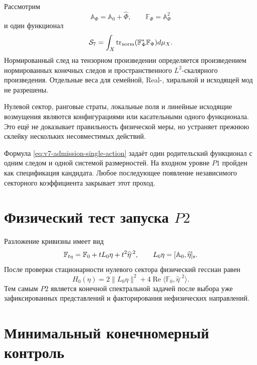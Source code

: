 Рассмотрим
\begin{equation}
 \mathbb A_\Phi=\mathbb A_0+\widehat\Phi,
 \qquad
 \mathbb F_\Phi=\mathbb A_\Phi^2
\end{equation}
и один функционал
\begin{equation}
 \mathcal S_7
 =\int_X\operatorname{tr}_{\rm norm}
 (\mathbb F_\Phi^*\mathbb F_\Phi)d\mu_X.
 \label{eq:v7-admission-single-action}
\end{equation}
Нормированный след на тензорном произведении определяется произведением
нормированных конечных следов и пространственного $L^2$-скалярного
произведения. Отдельные веса для семейной, Real-, хиральной и исходящей мод
не разрешены.

Нулевой сектор, ранговые страты, локальные поля и линейные исходящие
возмущения являются конфигурациями или касательными одного функционала.
Это ещё не доказывает правильность физической меры, но устраняет прежнюю
склейку нескольких несовместимых действий.

\begin{proposition}
Формула \eqref{eq:v7-admission-single-action} задаёт один родительский
функционал с одним следом и одной системой размерностей. На входном уровне
$P1$ пройден как спецификация кандидата. Любое последующее появление
независимого секторного коэффициента закрывает этот проход.
\end{proposition}

\section{Физический тест запуска \texorpdfstring{$P2$}{P2}}

Разложение кривизны имеет вид
\begin{equation}
 \mathbb F_{t\eta}
 =\mathbb F_0+tL_0\eta+t^2\widehat\eta^{,2},
 \qquad
 L_0\eta=[\mathbb A_0,\widehat\eta]_{\rm s}.
\end{equation}
После проверки стационарности нулевого сектора физический гессиан равен
\begin{equation}
 H_0(\eta)
 =2\|L_0\eta\|^2
 +4\operatorname{Re}
 \langle\mathbb F_0,\widehat\eta^{,2}\rangle.
 \label{eq:v7-admission-hessian}
\end{equation}
Тем самым $P2$ является конечной спектральной задачей после выбора уже
зафиксированных представлений и факторирования нефизических направлений.

\section{Минимальный конечномерный контроль}

